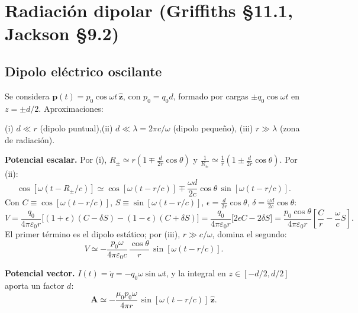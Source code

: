 \documentclass[11pt,a4paper]{article}
\theoremstyle{remark}
\begin{document}
\section{Radiación dipolar (Griffiths §11.1, Jackson §9.2)}

\subsection{Dipolo eléctrico oscilante}

Se considera $\mathbf p(t)=p_0\cos\omega t\,\hat{\mathbf z}$, con $p_0=q_0d$, formado por cargas
$\pm q_0\cos\omega t$ en $z=\pm d/2$. Aproximaciones:
\begin{center}
(i) $d\ll r$ (dipolo puntual),\qquad (ii) $d\ll\lambda=2\pi c/\omega$ (dipolo pequeño),\qquad
(iii) $r\gg\lambda$ (zona de radiación).
\end{center}

\textbf{Potencial escalar.} Por (i), $R_\pm\simeq r\left(1\mp\frac d{2r}\cos\theta\right)$ y
$\frac1{R_\pm}\simeq\frac1r\left(1\pm\frac d{2r}\cos\theta\right)$. Por (ii):
\[
\cos[\omega(t-R_\pm/c)]\simeq\cos[\omega(t-r/c)]\mp\frac{\omega d}{2c}\cos\theta\,\sin[\omega(t-r/c)].
\]
Con $C\equiv\cos[\omega(t-r/c)]$, $S\equiv\sin[\omega(t-r/c)]$, $\epsilon=\frac d{2r}\cos\theta$,
$\delta=\frac{\omega d}{2c}\cos\theta$:
\[
V=\frac{q_0}{4\pi\varepsilon_0r}\Big[(1+\epsilon)(C-\delta S)-(1-\epsilon)(C+\delta S)\Big]
=\frac{q_0}{4\pi\varepsilon_0r}\big[2\epsilon C-2\delta S\big]
=\frac{p_0\cos\theta}{4\pi\varepsilon_0r}\left[\frac{C}{r}-\frac{\omega}{c}S\right].
\]
El primer término es el dipolo estático; por (iii), $r\gg c/\omega$, domina el segundo:
\begin{equation}
V\simeq-\frac{p_0\omega}{4\pi\varepsilon_0c}\,\frac{\cos\theta}{r}\,\sin[\omega(t-r/c)].
\end{equation}

\textbf{Potencial vector.} $I(t)=\dot q=-q_0\omega\sin\omega t$, y la integral en
$z\in[-d/2,d/2]$ aporta un factor $d$:
\begin{equation}
\mathbf A\simeq-\frac{\mu_0p_0\omega}{4\pi r}\,\sin[\omega(t-r/c)]\,\hat{\mathbf z}.
\end{equation}
\end{document}
